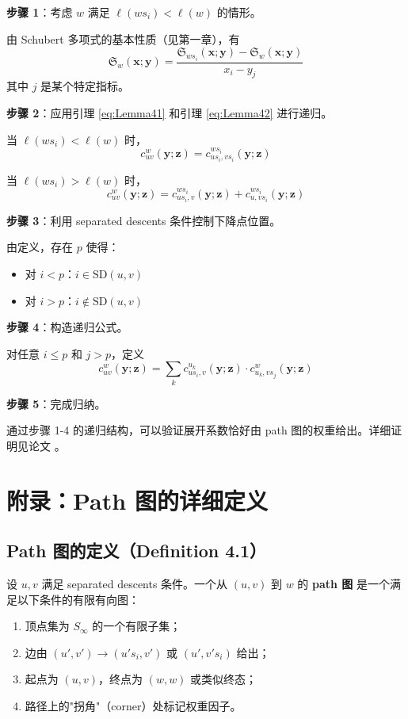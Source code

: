 \textbf{步骤 1}：考虑 $w$ 满足 $\ell(ws_i) < \ell(w)$ 的情形。

由 Schubert 多项式的基本性质（见第一章），有
$$\mathfrak{S}_w(\mathbf{x}; \mathbf{y}) = \frac{\mathfrak{S}_{ws_i}(\mathbf{x}; \mathbf{y}) - \mathfrak{S}_{w}(\mathbf{x}; \mathbf{y})}{x_i - y_j}$$
其中 $j$ 是某个特定指标。

\textbf{步骤 2}：应用引理 \cref{eq:Lemma41} 和引理 \cref{eq:Lemma42} 进行递归。

当 $\ell(ws_i) < \ell(w)$ 时，
$$c_{uv}^w(\mathbf{y}; \mathbf{z}) = c_{us_i, vs_i}^{ws_i}(\mathbf{y}; \mathbf{z})$$

当 $\ell(ws_i) > \ell(w)$ 时，
$$c_{uv}^w(\mathbf{y}; \mathbf{z}) = c_{us_i, v}^{ws_i}(\mathbf{y}; \mathbf{z}) + c_{u, vs_i}^{ws_i}(\mathbf{y}; \mathbf{z})$$

\textbf{步骤 3}：利用 separated descents 条件控制下降点位置。

由定义，存在 $p$ 使得：
\begin{itemize}
\item 对 $i < p$：$i \in \mathrm{SD}(u, v)$
\item 对 $i > p$：$i \notin \mathrm{SD}(u, v)$
\end{itemize}

\textbf{步骤 4}：构造递归公式。

对任意 $i \leq p$ 和 $j > p$，定义
$$c_{uv}^w(\mathbf{y}; \mathbf{z}) = \sum_{k} c_{us_i, v}^{u_k}(\mathbf{y}; \mathbf{z}) \cdot c_{u_k, vs_j}^{w}(\mathbf{y}; \mathbf{z})$$

\textbf{步骤 5}：完成归纳。

通过步骤 1-4 的递归结构，可以验证展开系数恰好由 path 图的权重给出。详细证明见论文 \cite[ Section 5]{Sa}。

\section{附录：Path 图的详细定义}
\label{sec:appendix-ch2-path}

\subsection*{Path 图的定义（Definition 4.1）}
\begin{Definition}
\label{def:PathDiagram}
设 $u, v$ 满足 separated descents 条件。一个从 $(u, v)$ 到 $w$ 的 \textbf{path 图} 是一个满足以下条件的有限有向图：
\begin{enumerate}
\item 顶点集为 $S_\infty$ 的一个有限子集；
\item 边由 $(u', v') \to (u's_i, v')$ 或 $(u', v's_i)$ 给出；
\item 起点为 $(u, v)$，终点为 $(w, w)$ 或类似终态；
\item 路径上的"拐角"（corner）处标记权重因子。
\end{enumerate}
\end{Definition}

